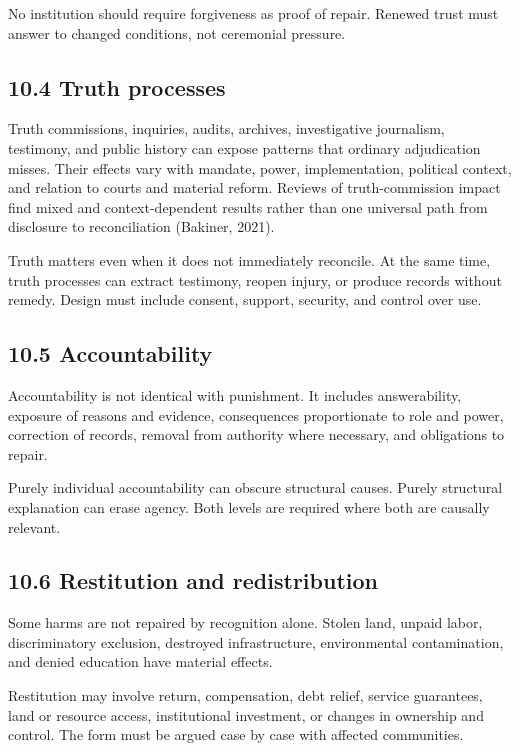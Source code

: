 \documentclass[
  11pt,
]{article}
\begin{document}
No institution should require forgiveness as proof of repair. Renewed
trust must answer to changed conditions, not ceremonial pressure.

\subsection{10.4 Truth processes}\label{truth-processes}

Truth commissions, inquiries, audits, archives, investigative
journalism, testimony, and public history can expose patterns that
ordinary adjudication misses. Their effects vary with mandate, power,
implementation, political context, and relation to courts and material
reform. Reviews of truth-commission impact find mixed and
context-dependent results rather than one universal path from disclosure
to reconciliation (Bakiner, 2021).

Truth matters even when it does not immediately reconcile. At the same
time, truth processes can extract testimony, reopen injury, or produce
records without remedy. Design must include consent, support, security,
and control over use.

\subsection{10.5 Accountability}\label{accountability}

Accountability is not identical with punishment. It includes
answerability, exposure of reasons and evidence, consequences
proportionate to role and power, correction of records, removal from
authority where necessary, and obligations to repair.

Purely individual accountability can obscure structural causes. Purely
structural explanation can erase agency. Both levels are required where
both are causally relevant.

\subsection{10.6 Restitution and
redistribution}\label{restitution-and-redistribution}

Some harms are not repaired by recognition alone. Stolen land, unpaid
labor, discriminatory exclusion, destroyed infrastructure, environmental
contamination, and denied education have material effects.

Restitution may involve return, compensation, debt relief, service
guarantees, land or resource access, institutional investment, or
changes in ownership and control. The form must be argued case by case
with affected communities.
\end{document}
